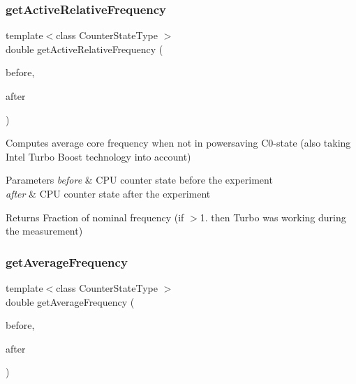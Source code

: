 \subsubsection{\texorpdfstring{get\+Active\+Relative\+Frequency}{getActiveRelativeFrequency}}
{\footnotesize\ttfamily template$<$class Counter\+State\+Type $>$ \\
double get\+Active\+Relative\+Frequency (\begin{DoxyParamCaption}\item[{const Counter\+State\+Type \&}]{before,  }\item[{const Counter\+State\+Type \&}]{after }\end{DoxyParamCaption})\hspace{0.3cm}{\ttfamily [friend]}}



Computes average core frequency when not in powersaving C0-\/state (also taking Intel Turbo Boost technology into account) 


\begin{DoxyParams}{Parameters}
{\em before} & C\+PU counter state before the experiment \\
\hline
{\em after} & C\+PU counter state after the experiment \\
\hline
\end{DoxyParams}
\begin{DoxyReturn}{Returns}
Fraction of nominal frequency (if $>$1. then Turbo was working during the measurement) 
\end{DoxyReturn}
\mbox{\label{class_basic_counter_state_aa398facfd523b7dcdbf827a74970a88c}} 
\subsubsection{\texorpdfstring{get\+Average\+Frequency}{getAverageFrequency}}
{\footnotesize\ttfamily template$<$class Counter\+State\+Type $>$ \\
double get\+Average\+Frequency (\begin{DoxyParamCaption}\item[{const Counter\+State\+Type \&}]{before,  }\item[{const Counter\+State\+Type \&}]{after }\end{DoxyParamCaption})\hspace{0.3cm}{\ttfamily [friend]}}



